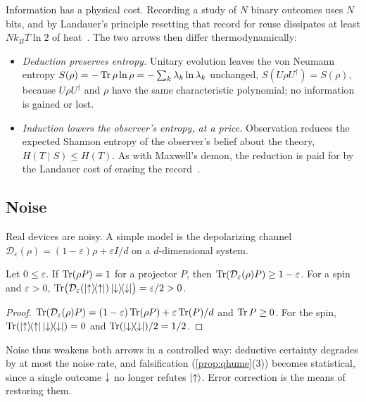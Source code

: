 Information has a physical cost. Recording a study of $N$ binary outcomes uses $N$ bits, and by
Landauer's principle resetting that record for reuse dissipates at least $N k_B T\ln 2$ of
heat~\cite{landauer,bennett}. The two arrows then differ thermodynamically:
\begin{itemize}
  \item \emph{Deduction preserves entropy.} Unitary evolution leaves the von Neumann entropy
        $S(\rho)=-\operatorname{Tr}\rho\ln\rho=-\sum_k\lambda_k\ln\lambda_k$ unchanged, $S(U\rho U^\dagger)=S(\rho)$,
        because $U\rho U^\dagger$ and $\rho$ have the same characteristic polynomial; no
        information is gained or lost.
  \item \emph{Induction lowers the observer's entropy, at a price.} Observation reduces the
        expected Shannon entropy of the observer's belief about the theory,
        $H(T\mid S)\le H(T)$. As with Maxwell's demon, the reduction is paid for by the
        Landauer cost of erasing the record~\cite{bennett}.
\end{itemize}

\subsection{Noise}\label{sec:noise}

Real devices are noisy. A simple model is the depolarizing channel
$\mathcal D_\varepsilon(\rho)=(1-\varepsilon)\rho+\varepsilon I/d$ on a $d$-dimensional system.

\begin{proposition}\label{prop:noise}
Let $0\le\varepsilon$. If $\operatorname{Tr}(\rho P)=1$ for a projector $P$, then
$\operatorname{Tr}(\mathcal D_\varepsilon(\rho)P)\ge1-\varepsilon$. For a spin and $\varepsilon>0$,
$\operatorname{Tr}\bigl(\mathcal D_\varepsilon(\lvert {\uparrow}\rangle\!\langle {\uparrow}\rvert)\,\lvert {\downarrow}\rangle\!\langle {\downarrow}\rvert\bigr)=\varepsilon/2>0$.
\end{proposition}

\begin{proof}
$\operatorname{Tr}(\mathcal D_\varepsilon(\rho)P)=(1-\varepsilon)\operatorname{Tr}(\rho P)+\varepsilon\operatorname{Tr}(P)/d$ and $\operatorname{Tr} P\ge0$. For
the spin, $\operatorname{Tr}(\lvert {\uparrow}\rangle\!\langle {\uparrow}\rvert\,\lvert {\downarrow}\rangle\!\langle {\downarrow}\rvert)=0$ and $\operatorname{Tr}(\lvert {\downarrow}\rangle\!\langle {\downarrow}\rvert)/2=1/2$.
\end{proof}

Noise thus weakens both arrows in a controlled way: deductive certainty degrades by at most the
noise rate, and falsification (\cref{prop:qhume}(3)) becomes statistical, since a single outcome
${\downarrow}$ no longer refutes $\lvert {\uparrow}\rangle$. Error correction is the means of restoring them.

